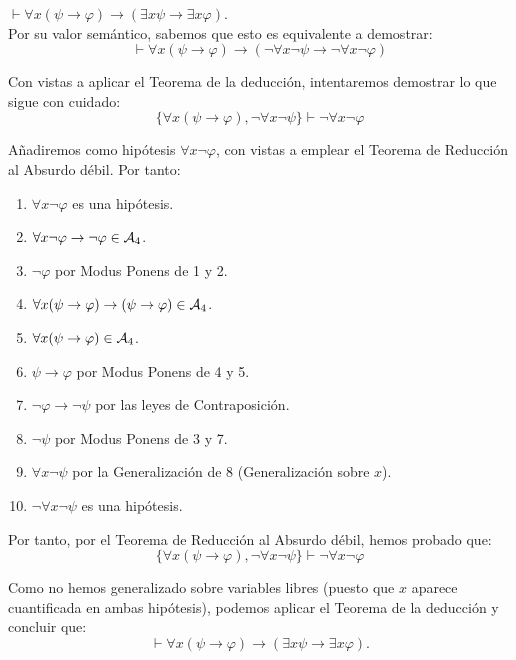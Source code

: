 \begin{ejercicio}\label{ej:2.8}
    $\vdash \forall x(\psi \rightarrow \varphi) \rightarrow (\exists x \psi \rightarrow \exists x \varphi)$.\\

    Por su valor semántico, sabemos que esto es equivalente a demostrar:
    \begin{equation*}
        \vdash \forall x(\psi \rightarrow \varphi) \rightarrow (\neg\forall x\neg \psi \rightarrow \neg\forall x\neg \varphi)
    \end{equation*}

    Con vistas a aplicar el Teorema de la deducción, intentaremos demostrar lo que sigue con cuidado:
    \begin{equation*}
        \{\forall x(\psi \rightarrow \varphi), \neg\forall x\neg \psi \}\vdash \neg\forall x\neg \varphi
    \end{equation*}

    Añadiremos como hipótesis $\forall x\neg \varphi$, con vistas a emplear el Teorema de Reducción al Absurdo débil. Por tanto:
    \begin{enumerate}
        \item $\forall x\neg \varphi$ es una hipótesis.
        \item $\forall x\neg\varphi \rightarrow \neg\varphi\in \mathcal{A}_4$.
        \item $\neg\varphi$ por Modus Ponens de 1 y 2.
        \item $\forall x(\psi \rightarrow \varphi)\rightarrow (\psi \rightarrow \varphi)\in \mathcal{A}_4$.
        \item $\forall x(\psi \rightarrow \varphi)\in \mathcal{A}_4$.
        \item $\psi \rightarrow \varphi$ por Modus Ponens de 4 y 5.
        \item $\neg \varphi \rightarrow \neg \psi$ por las leyes de Contraposición.
        \item $\neg \psi$ por Modus Ponens de 3 y 7.
        \item $\forall x\neg \psi$ por la Generalización de $8$ \qquad (Generalización sobre $x$).
        \item $\neg\forall x\neg \psi$ es una hipótesis.
    \end{enumerate}

    Por tanto, por el Teorema de Reducción al Absurdo débil, hemos probado que:
    \begin{equation*}
        \{\forall x(\psi \rightarrow \varphi), \neg\forall x\neg \psi \}\vdash \neg\forall x\neg \varphi
    \end{equation*}

    Como no hemos generalizado sobre variables libres (puesto que $x$ aparece cuantificada en ambas hipótesis), podemos aplicar el Teorema de la deducción y concluir que:
    \begin{equation*}
        \vdash \forall x(\psi \rightarrow \varphi) \rightarrow (\exists x \psi \rightarrow \exists x \varphi).
    \end{equation*}
    
\end{ejercicio}

